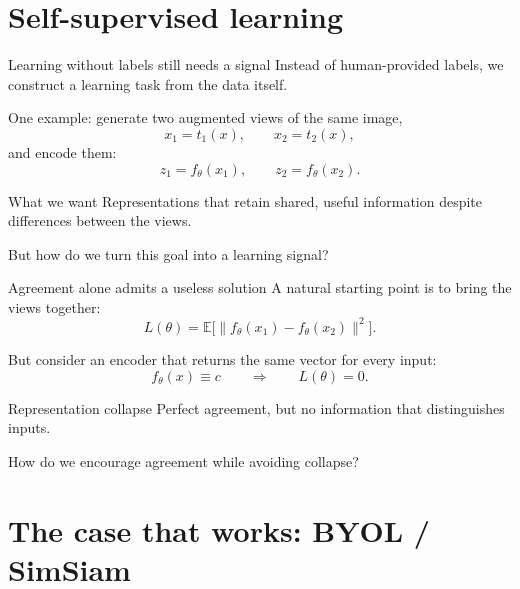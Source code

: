 \documentclass[aspectratio=169]{beamer}
\begin{document}
\section{Self-supervised learning}

\begin{frame}{Learning without labels still needs a signal}
  Instead of human-provided labels, we construct a learning task
  from the data itself.

  \vspace{0.6em}
  One example: generate two augmented views of the same image,
  \[
    x_1 = t_1(x), \qquad x_2 = t_2(x),
  \]
  and encode them:
  \[
    z_1 = f_\theta(x_1), \qquad z_2 = f_\theta(x_2).
  \]

  \begin{block}{What we want}
    Representations that retain shared, useful information
    despite differences between the views.
  \end{block}

  But how do we turn this goal into a learning signal?
\end{frame}

\begin{frame}{Agreement alone admits a useless solution}
  A natural starting point is to bring the views together:
  \[
    L(\theta)
    = \mathbb{E}\big[
        \|f_\theta(x_1)-f_\theta(x_2)\|^2
      \big].
  \]

  \vspace{0.4em}
  But consider an encoder that returns the same vector
  for every input:
  \[
    f_\theta(x) \equiv c
    \qquad \Longrightarrow \qquad L(\theta)=0.
  \]

  \begin{alertblock}{Representation collapse}
    Perfect agreement, but no information that distinguishes inputs.
  \end{alertblock}

  \begin{center}
    How do we encourage agreement while avoiding collapse?
  \end{center}
\end{frame}
\section{The case that works: BYOL / SimSiam}
\end{document}
